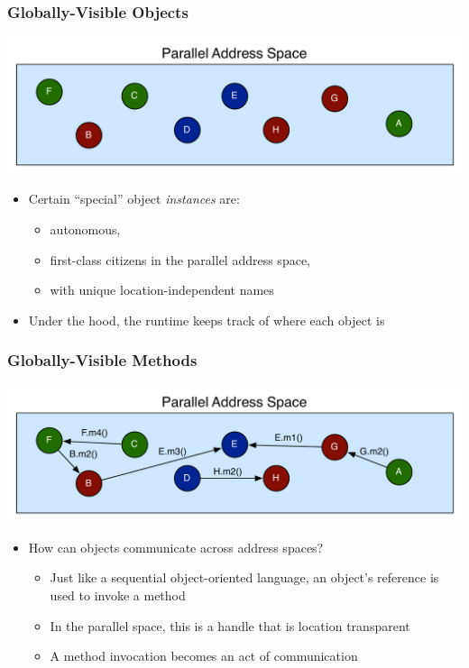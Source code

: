 \begin{frame}[fragile]
  \frametitle{Globally-Visible Objects}
  \begin{center}
    \includegraphics[width=\textwidth]{figures/objectGlobalAddress.pdf}
  \end{center}
  \begin{itemize}
    \item Certain ``special'' object \emph{instances} are:
      \begin{itemize}
      \item autonomous,
      \item first-class citizens in the parallel address space,
      \item with unique location-independent names
      \end{itemize}
    \item Under the hood, the runtime keeps track of where each object
      is
  \end{itemize}
\end{frame}

\begin{frame}[fragile]
  \frametitle{Globally-Visible Methods}
  \begin{center}
    \includegraphics[width=\textwidth]{figures/objectMethodGlobalAddress.pdf}
  \end{center}
  \begin{itemize}
    \item How can objects communicate across address spaces?
      \begin{itemize}
      \item Just like a sequential object-oriented language, an object's
        reference is used to invoke a method
      \item In the parallel space, this is a handle that is location
          transparent
      \item A method invocation becomes an act of communication
      \end{itemize}
  \end{itemize}
\end{frame}

